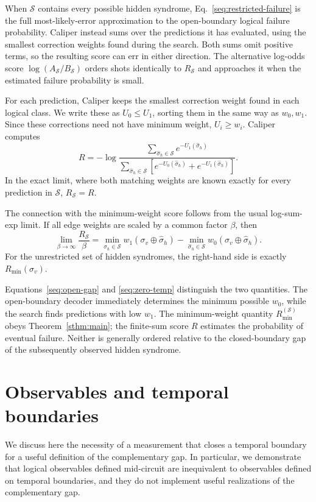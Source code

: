 \documentclass[
    reprint,
    amsmath,amssymb,
    nofootinbib,
    superscriptaddress,
    aps,
    noeprint,
    longbibliography,
    prl
]{revtex4-2}
\theoremstyle{plain}
\begin{document}
When $\mathcal S$ contains every possible hidden syndrome,
Eq.~\eqref{seq:restricted-failure} is the full most-likely-error approximation to the open-boundary
logical failure probability. Caliper instead sums over the predictions it has evaluated, using the smallest correction weights found during the search. Both sums omit positive terms, so the
resulting score can err in either direction. The alternative log-odds score
$\log(A_{\mathcal S}/B_{\mathcal S})$ orders shots identically to $R_{\mathcal S}$ and approaches it
when the estimated failure probability is small.

For each prediction, Caliper keeps the smallest correction weight found in each logical class.
We write these as $U_0\leq U_1$, sorting them in the same way as $w_0,w_1$. Since these corrections
need not have minimum weight, $U_i\geq w_i$. Caliper computes
\begin{equation}
    R=-\log\frac{\sum_{\hat\sigma_h\in\mathcal S}e^{-U_1(\hat\sigma_h)}}
    {\sum_{\hat\sigma_h\in\mathcal S}
    \left[e^{-U_0(\hat\sigma_h)}+e^{-U_1(\hat\sigma_h)}\right]}.
    \label{seq:implemented-score}
\end{equation}
In the exact limit, where both matching weights are known exactly for every prediction in
$\mathcal S$, $R_{\mathcal S}=R$.

The connection with the minimum-weight score follows from the usual log-sum-exp limit. If all edge
weights are scaled by a common factor $\beta$, then
\begin{equation}
    \lim_{\beta\rightarrow\infty}
    \frac{R_{\mathcal S}}{\beta}
    =
    \min_{\hat\sigma_h\in\mathcal S}
    w_1(\sigma_v\oplus\hat\sigma_h)
    -
    \min_{\hat\sigma_h\in\mathcal S}
    w_0(\sigma_v\oplus\hat\sigma_h).
    \label{seq:zero-temp}
\end{equation}
For the unrestricted set of hidden syndromes, the right-hand side is exactly $R_{\min}(\sigma_v)$.

Equations~\eqref{seq:open-gap} and \eqref{seq:zero-temp} distinguish the two quantities.
The open-boundary decoder immediately determines the minimum possible $w_0$, while the search
finds predictions with low $w_1$. The minimum-weight quantity $R_{\min}^{(\mathcal S)}$ obeys
Theorem~\ref{sthm:main}; the finite-sum score $R$ estimates the probability of eventual failure.
Neither is generally ordered relative to the closed-boundary gap of the subsequently observed
hidden syndrome.

\section{Observables and temporal boundaries}
We discuss here the necessity of a measurement that closes a temporal boundary for a useful
definition of the complementary gap. In particular, we demonstrate that logical observables defined
mid-circuit are inequivalent to observables defined on temporal boundaries, and they do not
implement useful realizations of the complementary gap.
\end{document}
